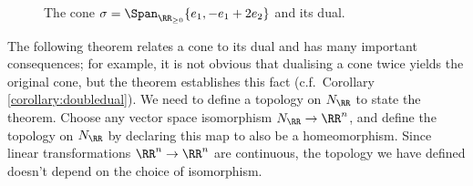 \documentclass[12pt]{amsart}
\theoremstyle{plain}
\theoremstyle{definition}
\begin{document}
\begin{figure}[H]
    \centering
    \caption{The cone $\sigma=\Span_{\RR_{\ge 0}} \{e_1, - e_1 + 2 e_2\}$ and its dual.}
     \label{figureconeanddual}
\end{figure}

The following theorem relates a cone to its dual and has many important consequences;
for example, it is not obvious that dualising a cone twice yields the original cone, but the theorem establishes this fact (c.f.\ Corollary \ref{corollary:doubledual}).
We need to define a topology on $N_\RR$ to state the theorem.
Choose any vector space isomorphism $N_\RR \to \RR^n$, and define the topology on $N_\RR$ by declaring this map to also be a homeomorphism.
Since linear transformations $\RR^n \to \RR^n$ are continuous, the topology we have defined doesn't depend on the choice of isomorphism.
\end{document}
